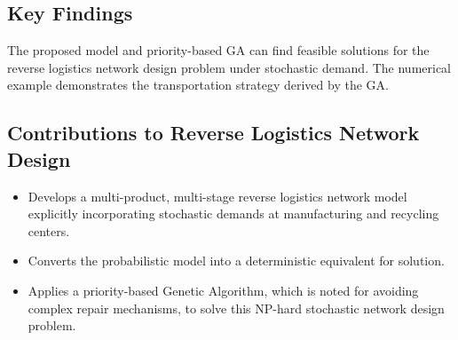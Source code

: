\subsection*{Key Findings}
The proposed model and priority-based GA can find feasible solutions for the reverse logistics network design problem under stochastic demand. The numerical example demonstrates the transportation strategy derived by the GA.

\subsection*{Contributions to Reverse Logistics Network Design}
\begin{itemize}
    \item Develops a multi-product, multi-stage reverse logistics network model explicitly incorporating stochastic demands at manufacturing and recycling centers.
    \item Converts the probabilistic model into a deterministic equivalent for solution.
    \item Applies a priority-based Genetic Algorithm, which is noted for avoiding complex repair mechanisms, to solve this NP-hard stochastic network design problem.
\end{itemize}